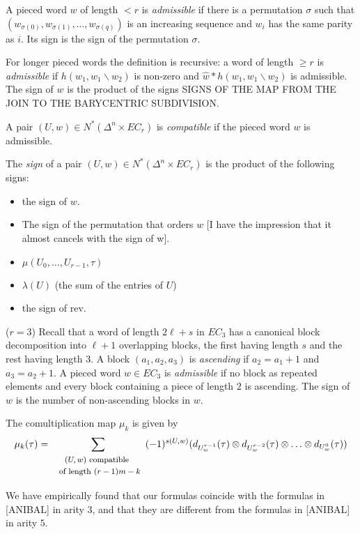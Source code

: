 \begin{definition} A pieced word $w$ of length $<r$ is \emph{admissible} if there is a permutation $\sigma$ such that $(w_{\sigma(0)},w_{\sigma(1)},\ldots,w_{\sigma(q)})$ is an increasing sequence and $w_{i}$ has the same parity as $i$. Its sign is the sign of the permutation $\sigma$.

For longer pieced words the definition is recursive: a word of length $\geq r$ is \emph{admissible} if $h(w_1,w_1\smallsetminus w_2)$ is non-zero and $\hat{w}*h(w_1,w_1\smallsetminus w_2)$ is admissible. The sign of $w$ is the product of the signs SIGNS OF THE MAP FROM THE JOIN TO THE BARYCENTRIC SUBDIVISION. 
\end{definition}
\begin{definition}
    A pair $(U,w)\in N^*(\Delta^n\times EC_r)$ is \emph{compatible} if the pieced word $w$ is admissible.
\end{definition}
\begin{definition}
    The \emph{sign} of a pair $(U,w)\in N^*(\Delta^n\times EC_r)$ is the product of the following signs:
    \begin{itemize}
    \item the sign of $w$.
    \item The sign of the permutation that orders $w$ [I have the impression that it almost cancels with the sign of w].
    \item $\mu(U_0,\ldots,U_{r-1},\tau)$
    \item $\lambda(U)$ (the sum of the entries of $U$)
    \item the sign of $\mathrm{rev}$. 
\end{itemize}
\end{definition}
\begin{example}
    ($r=3$) Recall that a word of length $2\ell+s$ in $EC_3$ has a canonical block decomposition into $\ell+1$ overlapping blocks, the first having length $s$ and the rest having length $3$. A block $(a_1,a_2,a_3)$ is \emph{ascending} if $a_2=a_1+1$ and $a_3=a_2+1$. A pieced word $w\in EC_3$ is \emph{admissible} if no block as repeated elements and every block containing a piece of length $2$ is ascending. The sign of $w$ is the number of non-ascending blocks in $w$.
\end{example}
The comultiplication map $\mu_k$ is given by
\[\mu_k(\tau) = \sum_{\begin{array}{c}\text{\footnotesize $(U,w)$ compatible }\\ \text{ \footnotesize of length $(r-1)m-k$}\end{array}} (-1)^{s(U,w)}(d_{U^{r-1}_{w}}(\tau)\otimes d_{U^{r-2}_{w}}(\tau)\otimes \ldots \otimes d_{U^{0}_{w}}(\tau) )\]

We have empirically found that our formulas coincide with the formulas in [ANIBAL] in arity $3$, and that they are different from the formulas in [ANIBAL] in arity $5$.
